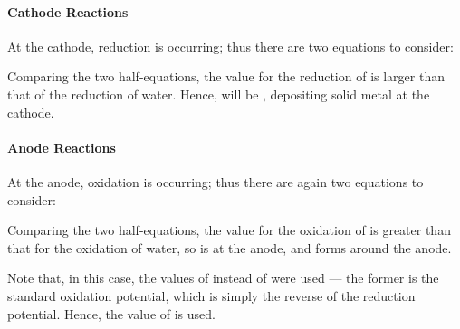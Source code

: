 				\paragraph{Cathode Reactions}

				At the cathode, reduction is occurring; thus there are two equations to consider:


				Comparing the two half-equations, the \Eo{} value for the reduction of  is larger than that of the reduction of water.
				Hence,  will be , depositing solid  metal at the cathode.




				\paragraph{Anode Reactions}

				At the anode, oxidation is occurring; thus there are again two equations to consider:


				Comparing the two half-equations, the \Eox{} value for the oxidation of  is greater than that for
				the oxidation of water, so  is  at the anode, and  forms around the anode.

				Note that, in this case, the values of \Eox{} instead of \Eo{} were used --- the former is the standard oxidation
				potential, which is simply the reverse of the reduction potential. Hence, the  value of \Eox{} is used.

